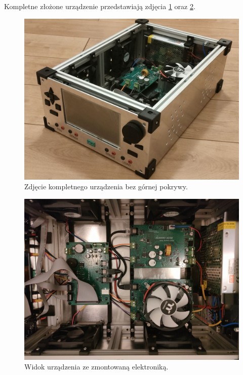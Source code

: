 Kompletne złożone urządzenie przedstawiają zdjęcia \ref{fig:kompletne_urzadzenie} oraz \ref{fig:rzut_z_gory}.

\begin{figure}[h!]
    \begin{center}
        \includegraphics[width = 15cm]{images/zdjecie_kompletne.jpg}
        \caption{Zdjęcie kompletnego urządzenia bez górnej pokrywy.} 
        \label{fig:kompletne_urzadzenie}
    \end{center}
\end{figure}

\begin{figure}[h!]
    \begin{center}
        \includegraphics[angle=90, width = 15cm]{images/zdjecie_elektroniki.jpg}
        \caption{Widok urządzenia ze zmontowaną elektroniką.}
        \label{fig:rzut_z_gory}
    \end{center}
\end{figure}

